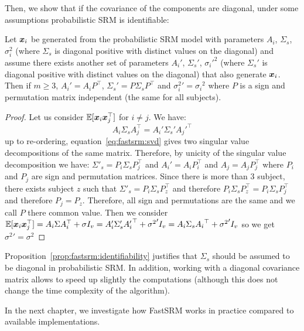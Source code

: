 Then, we show that if the covariance of the components are diagonal, under some
assumptions probabilistic SRM is identifiable:
\begin{prop}
  \label{prop:fastsrm:identifiability}
  Let $\boldsymbol{x}_i$ be generated from the probabilistic SRM model with parameters 
  $A_i$, $\Sigma_s$, $\sigma_i^2$ (where $\Sigma_s$ is diagonal positive with
  distinct values on the diagonal) and assume there exists another set of parameters $A_i'$, $\Sigma_s'$,
  ${\sigma_i'}^2$ (where $\Sigma_s'$ is diagonal positive with
  distinct values on the diagonal) that also generate $\boldsymbol{x}_i$.
Then if $m\geq 3$, $A_i' = A_i P^{\top}$, $\Sigma_s'= P\Sigma_sP^{\top}$ and
  ${\sigma_i^2}' = {\sigma_i}^2$ where $P$ is a sign and permutation matrix
  independent (the same for all subjects).
\end{prop}
\begin{proof}
  Let us consider $\mathbb{E}[\boldsymbol{x}_i \boldsymbol{x}_j^{\top}]$ for $i \neq j$.
  We have:
  \begin{equation}
  A_i \Sigma_s A_j^{\top} = A_i' \Sigma_s' {A_j'}^{\top}
  \label{eq:fastsrm:svd}
  \end{equation}
  up to re-ordering, equation~\eqref{eq:fastsrm:svd} gives two singular value
  decompositions of the same matrix.
  Therefore, by unicity of the singular value decomposition we have:
  $\Sigma'_s = P_i \Sigma_s P_j^{\top}$ and $A_i' = A_i P_i^{\top}$ and $A_j =
  A_j P_j^{\top}$ where $P_i$ and $P_j$ are sign and permutation matrices.
  Since there is more than 3 subject, there exists subject $z$ such that
  $\Sigma'_s = P_i \Sigma_s P_z^{\top}$ and therefore
  $P_i \Sigma_s P_z^{\top} =  P_i \Sigma_s P_j^{\top}$ and therefore $P_j =
  P_z$. Therefore, all sign and permutations are the same and we call $P$ there
  common value.
  Then we consider
  $\mathbb{E}[\boldsymbol{x}_i \boldsymbol{x}_j^{\top}] = A_i \Sigma A_i^{\top} + \sigma I_v = A_i' \Sigma_s'
  {A_i'}^{\top} + {\sigma^2}' I_v = A_i \Sigma_s
  {A_i}^{\top} + {\sigma^2}' I_v$
  so we get ${\sigma^2}' = {\sigma^2}$
\end{proof}

Proposition~\eqref{prop:fastsrm:identifiability} justifies that
$\Sigma_s$ should be assumed to be diagonal in probabilistic SRM.
In addition, working with a diagonal covariance matrix allows to speed up
slightly the computations (although this does not change the time complexity of
the algorithm).

In the next chapter, we investigate how FastSRM works in practice compared to
available implementations.